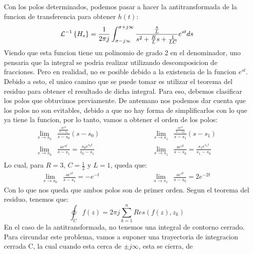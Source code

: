 \documentclass[12pt,a4paper]{report}
\begin{document}
\begin{enumerate}[label=\alph*)]
    Con los polos determinados, podemos pasar a hacer la antitransformada de la funcion de transferencia para obtener
    $h(t)$:
    \begin{equation*}
      \mathcal{L}^{-1}\left\{H_s\right\} = \frac{1}{2\pi j} \int_{\sigma - j\infty}^{\sigma + j\infty}
        \frac{\frac{s}{L}}{s^2 + \frac{R}{L} s + \frac{1}{LC}} e^{st} ds\\[6pt]
    \end{equation*}
    Viendo que esta funcion tiene un polinomio de grado 2 en el denominador, uno pensaria que la integral se podria
    realizar utilizando descomposicion de fracciones. Pero en realidad, no es posible debido a la existencia de la
    funcion $e^{st}$. Debido a esto, el unico camino que se puede tomar es utilizar el teorema del residuo para obtener
    el resultado de dicha integral. Para eso, debemos clasificar los polos que obtuvimos previamente. De antemano nos
    podemos dar cuenta que los polos no son evitables, debido a que no hay forma de simplificarlos con lo que ya tiene
    la funcion, por lo tanto, vamos a obtener el orden de los polos:
    \begin{align*}
      \lim_{s \to s_0}& \frac{\frac{s e^{st}}{s - s_1}}{s - s_0} (s - s_0) \hspace{3cm}
                      &\lim_{s \to s_1}& \frac{\frac{s e^{st}}{s - s_0}}{s - s_1} (s - s_1)\\[6pt]
      \lim_{s \to s_0}& \frac{s e^{st}}{s - s_1} = \frac{s_0 e^{s_0t}}{s_0 - s_1} 
                      &\lim_{s \to s_1}& \frac{s e^{st}}{s - s_0} = \frac{s_1 e^{s_1t}}{s_1 - s_0}\\[6pt]
    \end{align*}
    Lo cual, para $R = 3$, $C = \frac{1}{2}$ y $L = 1$, queda que:
    \begin{align*}
      \lim_{s \to s_0}& \frac{s e^{st}}{s - s_1} = -e^{-t} \hspace{3cm}
                      &\lim_{s \to s_1}& \frac{s e^{st}}{s - s_0} = 2e^{-2t}
    \end{align*}
    Con lo que nos queda que ambos polos son de primer orden. Segun el teorema del residuo, tenemos que:
    \begin{equation*}
      \oint_C f(z) = 2\pi j \sum_{k=1}^{n} Res(f(z), z_k)
    \end{equation*}
    En el caso de la antitransformada, no tenemos una integral de contorno cerrado. Para circundar este problema, vamos
    a suponer una trayectoria de integracion cerrada C, la cual cuando esta cerca de $\pm j \infty$, esta se cierra, de

\end{enumerate}
\end{document}
